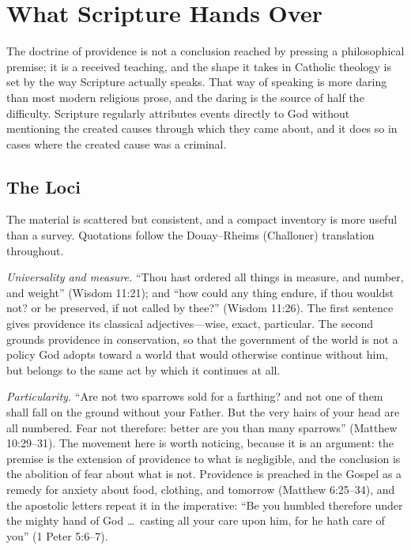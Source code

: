 \section{What Scripture Hands Over}

The doctrine of providence is not a conclusion reached by pressing a philosophical premise; it is a received teaching, and the shape it takes in Catholic theology is set by the way Scripture actually speaks. That way of speaking is more daring than most modern religious prose, and the daring is the source of half the difficulty. Scripture regularly attributes events directly to God without mentioning the created causes through which they came about, and it does so in cases where the created cause was a criminal.

\subsection{The Loci}

The material is scattered but consistent, and a compact inventory is more useful than a survey. Quotations follow the Douay--Rheims (Challoner) translation throughout.

\emph{Universality and measure.} ``Thou hast ordered all things in measure, and number, and weight'' (Wisdom 11:21); and ``how could any thing endure, if thou wouldst not? or be preserved, if not called by thee?'' (Wisdom 11:26). The first sentence gives providence its classical adjectives---wise, exact, particular. The second grounds providence in conservation, so that the government of the world is not a policy God adopts toward a world that would otherwise continue without him, but belongs to the same act by which it continues at all.

\emph{Particularity.} ``Are not two sparrows sold for a farthing? and not one of them shall fall on the ground without your Father. But the very hairs of your head are all numbered. Fear not therefore: better are you than many sparrows'' (Matthew 10:29--31). The movement here is worth noticing, because it is an argument: the premise is the extension of providence to what is negligible, and the conclusion is the abolition of fear about what is not. Providence is preached in the Gospel as a remedy for anxiety about food, clothing, and tomorrow (Matthew 6:25--34), and the apostolic letters repeat it in the imperative: ``Be you humbled therefore under the mighty hand of God \ldots\ casting all your care upon him, for he hath care of you'' (1 Peter 5:6--7).

